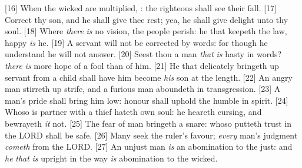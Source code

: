 [16] \textcolor[cmyk]{0.99998,1,0,0}{When the wicked are multiplied, :  the righteous shall see their fall.}
[17] \textcolor[cmyk]{0.99998,1,0,0}{Correct thy son, and he shall give thee rest; yea, he shall give delight unto thy soul.}
[18] \textcolor[cmyk]{0.99998,1,0,0}{Where \emph{there} \emph{is} no vision, the people perish:  he that keepeth the law, happy \emph{is} he.}
[19] \textcolor[cmyk]{0.99998,1,0,0}{A servant will not be corrected by words: for though he understand he will not answer.}
[20] \textcolor[cmyk]{0.99998,1,0,0}{Seest thou a man \emph{that} \emph{is} hasty in  words? \emph{there} \emph{is} more hope of a fool than of him.}
[21] \textcolor[cmyk]{0.99998,1,0,0}{He that delicately bringeth up  servant from a child shall have him become \emph{his} son at the length.}
[22] \textcolor[cmyk]{0.99998,1,0,0}{An angry man stirreth up strife, and a furious man aboundeth in transgression.}
[23] \textcolor[cmyk]{0.99998,1,0,0}{A man's pride shall bring him low:  honour shall uphold the humble in spirit.}
[24] \textcolor[cmyk]{0.99998,1,0,0}{Whoso is partner with a thief hateth  own soul: he heareth cursing, and bewrayeth \emph{it} not.}
[25] \textcolor[cmyk]{0.99998,1,0,0}{The fear of man bringeth a snare:  whoso putteth  trust in the LORD shall be safe.}
[26] \textcolor[cmyk]{0.99998,1,0,0}{Many seek the ruler's favour;  \emph{every} man's judgment \emph{cometh} from the LORD.}
[27] \textcolor[cmyk]{0.99998,1,0,0}{An unjust man \emph{is} an abomination to the just: and \emph{he} \emph{that} \emph{is} upright in the way \emph{is} abomination to the wicked.}


